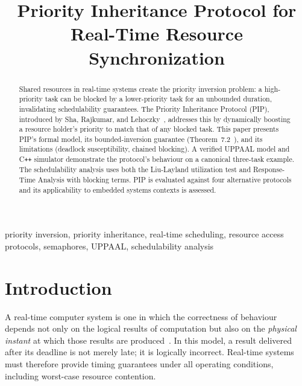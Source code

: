 \documentclass[conference]{IEEEtran}
\begin{document}
\title{Priority Inheritance Protocol for Real-Time Resource Synchronization}

\author{
}

\maketitle

\begin{abstract}
Shared resources in real-time systems create the priority inversion
problem: a high-priority task can be blocked by a lower-priority task
for an unbounded duration, invalidating schedulability guarantees.
The Priority Inheritance Protocol (PIP), introduced by Sha, Rajkumar,
and Lehoczky~\cite{Sha1990}, addresses this by dynamically boosting a
resource holder's priority to match that of any blocked task.
This paper presents PIP's formal model, its bounded-inversion
guarantee (Theorem~7.2~\cite{Buttazzo2011}), and its limitations
(deadlock susceptibility, chained blocking). A verified UPPAAL model
and C\texttt{++} simulator demonstrate the protocol's behaviour on a
canonical three-task example. The schedulability analysis uses both
the Liu-Layland utilization test and Response-Time Analysis with
blocking terms. PIP is evaluated against four alternative protocols
and its applicability to embedded systems contexts is assessed.
\end{abstract}

\begin{IEEEkeywords}
priority inversion, priority inheritance, real-time scheduling,
resource access protocols, semaphores, UPPAAL, schedulability analysis
\end{IEEEkeywords}

\section{Introduction}
\label{sec:intro}

A real-time computer system is one in which the correctness of
behaviour depends not only on the logical results of computation but
also on the \emph{physical instant} at which those results are
produced~\cite{Kopetz2011}.
In this model, a result delivered after its deadline is not merely late;
it is logically incorrect.
Real-time systems must therefore provide timing guarantees under all
operating conditions, including worst-case resource contention.
\end{document}
